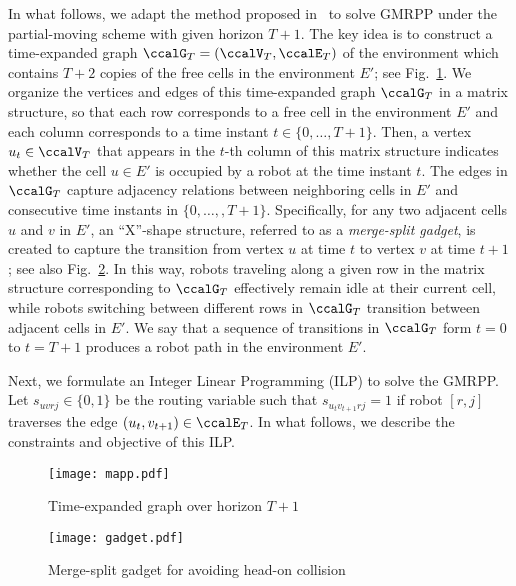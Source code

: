 \documentclass[Afour,sageh,times]{sagej}
\begin{document}
{{{  In what follows, we adapt the method proposed in~\cite{yu2016optimal} to solve GMRPP under the partial-moving scheme with given horizon $T+1$.   The key idea is to construct a time-expanded graph $\ccalG_T = (\ccalV_T, \ccalE_T)$ of the environment which contains $T+2$ copies of the free cells in the environment $E'$; see Fig.~\ref{fig:mapp}. We organize the vertices and edges of this time-expanded graph $\ccalG_T$ in a matrix structure, so that each row corresponds to a free cell in the environment $E'$ and each column corresponds to a time instant $t\in \{0,\ldots,T+1\}$. Then, a vertex $u_t \in \ccalV_T$ that appears in the $t$-th column of this matrix structure indicates whether the cell $u\in E'$ is occupied by a robot at the time instant $t$. The edges in $\ccalG_T$ capture  adjacency relations between neighboring cells in $E'$ and consecutive time instants in $\{0,\ldots,,T+1\}$. Specifically, for any two adjacent cells $u$ and $v$ in $E'$, an ``X''-shape structure, referred to as a {\it merge-split gadget}, is created to capture the transition from vertex $u$ at time $t$ to vertex $v$ at time $t+1$; see also Fig.~\ref{fig:gadget}. In this way, robots traveling along a given row in the matrix structure corresponding to $\ccalG_T$ effectively remain idle at their current cell, while robots switching between different rows in $\ccalG_T$ transition between adjacent cells in $E'$. We say that a sequence of transitions in $\ccalG_T$ form $t=0$ to $t=T+1$ produces a robot path in the environment $E'$.

Next, we formulate an Integer Linear Programming (ILP) to solve the GMRPP. Let $s_{uvrj} \in\{0,1\}$ be the routing variable such that $s_{u_{t}v_{t+1}rj} = 1$ if robot $[r,j]$ traverses the edge $(u_t,v_{t+1}) \in \ccalE_T$. In what follows, we describe the constraints and objective of this ILP.

\begin{figure}[t]
  \centering
  \texttt{[image: mapp.pdf]}
  \caption{Time-expanded graph over horizon $T+1$}
  \label{fig:mapp}
\end{figure}

\begin{figure}[t]
  \centering
  \texttt{[image: gadget.pdf]}
  \caption{Merge-split gadget for avoiding head-on collision}
  \label{fig:gadget}
\end{figure}
}}}
\end{document}
